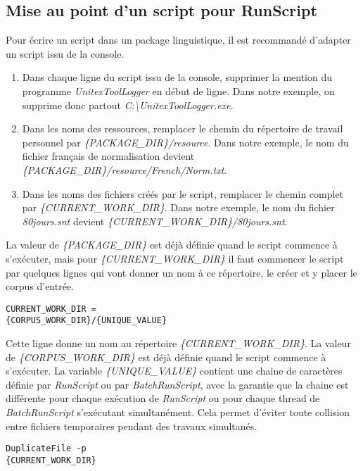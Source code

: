 \subsection{Mise au point d'un script pour RunScript}
\label{section-script-for-runscript}
Pour écrire un script dans un package linguistique, il est recommandé d'adapter un script issu de la console.

\begin{enumerate}
\item Dans chaque ligne du script issu de la console, supprimer la mention du programme \emph{UnitexToolLogger} en début de ligne. Dans notre exemple, on supprime donc partout \emph{C:\textbackslash UnitexToolLogger.exe}.
\item Dans les noms des ressources, remplacer le chemin du répertoire de travail personnel par \emph{\{PACKAGE\_DIR\}/resource}. Dans notre exemple, le nom du fichier français de normalisation devient \emph{\{PACKAGE\_DIR\}/resource/French/Norm.txt}.
\item Dans les noms des fichiers créés par le script, remplacer le chemin complet par \emph{\{CURRENT\_WORK\_DIR\}}. Dans notre exemple, le nom du fichier \emph{80jours.snt} devient \emph{\{CURRENT\_WORK\_DIR\}/80jours.snt}.
\end{enumerate}

\bigskip
\noindent La valeur de \emph{\{PACKAGE\_DIR\}} est déjà définie quand le script commence à s'exécuter, mais pour \emph{\{CURRENT\_WORK\_DIR\}} il faut commencer le script par quelques lignes qui vont donner un nom à ce répertoire, le créer et y placer le corpus d'entrée.

\begin{verbatim}
CURRENT_WORK_DIR = 
{CORPUS_WORK_DIR}/{UNIQUE_VALUE}
\end{verbatim}

\bigskip
\noindent Cette ligne donne un nom au répertoire \emph{\{CURRENT\_WORK\_DIR\}}. La valeur de \emph{\{CORPUS\_WORK\_DIR\}} est déjà définie quand le script commence à s'exécuter. La variable \emph{\{UNIQUE\_VALUE\}} contient une chaine de caractères définie par \emph{RunScript} ou par \emph{BatchRunScript}, avec la garantie que la chaine est différente pour chaque exécution de \emph{RunScript} ou pour chaque thread de \emph{BatchRunScript} s’exécutant simultanément. Cela permet d'éviter toute collision entre fichiers temporaires pendant des travaux simultanés.

\begin{verbatim}
DuplicateFile -p 
{CURRENT_WORK_DIR}
\end{verbatim}

